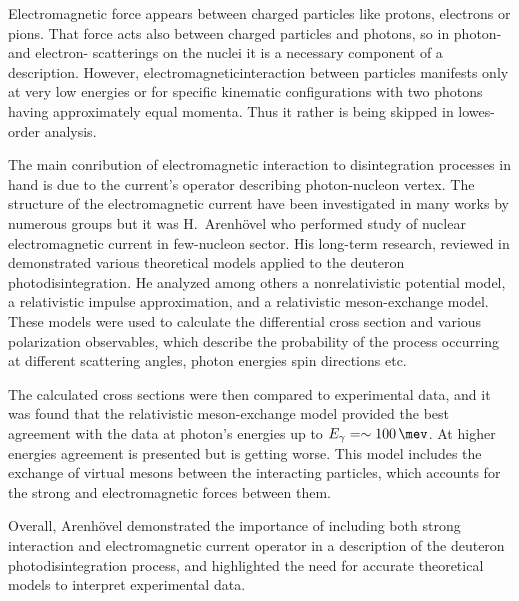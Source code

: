 Electromagnetic force appears between charged particles like protons, electrons or pions.
That force acts also between charged particles and photons, so 
in photon- and electron- scatterings on the nuclei 
it is a necessary component of a description.
However, electromagneticinteraction between particles manifests only at very 
low energies or for specific kinematic configurations with two
photons having approximately equal momenta.
Thus it rather is being skipped in lowes-order analysis.

The main conribution of electromagnetic interaction 
to disintegration processes in hand is due to the current's operator
describing photon-nucleon vertex.
The structure of the electromagnetic current have been investigated
in many works by numerous groups \cite{Carlson1997} but it was 
H.~Arenh\"{o}vel who performed study of nuclear electromagnetic
current in few-nucleon sector.
His long-term research, reviewed in \cite{ArenhovelPhotodisint1991}
demonstrated various theoretical models applied to the deuteron photodisintegration.
He analyzed among others a nonrelativistic potential model,
a relativistic impulse approximation, and a relativistic meson-exchange model.
These models were used to calculate the differential cross section and various
polarization observables, which describe the probability
of the process occurring at different scattering angles, photon energies spin directions etc.

The calculated cross sections were then compared to experimental data, and it was
found that the relativistic meson-exchange model provided
the best agreement with the data at photon's energies up to $E_\gamma = \sim\SI{100}{\mev}$.
At higher energies agreement is presented but is getting worse.
This model includes the exchange of virtual mesons
between the interacting particles, which accounts for
the strong and electromagnetic forces between them.

Overall, Arenh\"{o}vel demonstrated the importance of including both strong interaction
and electromagnetic current operator in a description of the deuteron photodisintegration process,
and highlighted the need for accurate theoretical models to interpret experimental data.



